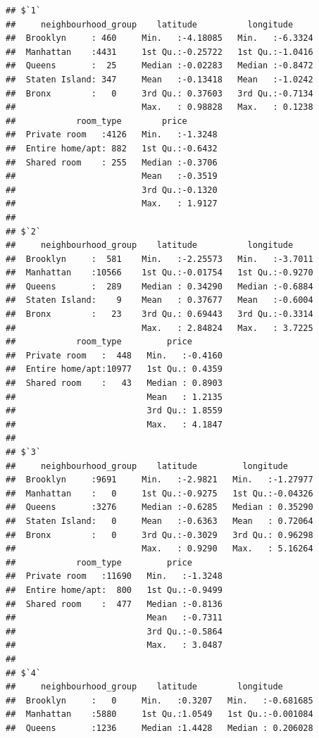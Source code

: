 \documentclass[
]{article}
\begin{document}
\begin{verbatim}
## $`1`
##     neighbourhood_group    latitude          longitude      
##  Brooklyn     : 460     Min.   :-4.18085   Min.   :-6.3324  
##  Manhattan    :4431     1st Qu.:-0.25722   1st Qu.:-1.0416  
##  Queens       :  25     Median :-0.02283   Median :-0.8472  
##  Staten Island: 347     Mean   :-0.13418   Mean   :-1.0242  
##  Bronx        :   0     3rd Qu.: 0.37603   3rd Qu.:-0.7134  
##                         Max.   : 0.98828   Max.   : 0.1238  
##            room_type        price        
##  Private room   :4126   Min.   :-1.3248  
##  Entire home/apt: 882   1st Qu.:-0.6432  
##  Shared room    : 255   Median :-0.3706  
##                         Mean   :-0.3519  
##                         3rd Qu.:-0.1320  
##                         Max.   : 1.9127  
## 
## $`2`
##     neighbourhood_group    latitude          longitude      
##  Brooklyn     :  581    Min.   :-2.25573   Min.   :-3.7011  
##  Manhattan    :10566    1st Qu.:-0.01754   1st Qu.:-0.9270  
##  Queens       :  289    Median : 0.34290   Median :-0.6884  
##  Staten Island:    9    Mean   : 0.37677   Mean   :-0.6004  
##  Bronx        :   23    3rd Qu.: 0.69443   3rd Qu.:-0.3314  
##                         Max.   : 2.84824   Max.   : 3.7225  
##            room_type         price        
##  Private room   :  448   Min.   :-0.4160  
##  Entire home/apt:10977   1st Qu.: 0.4359  
##  Shared room    :   43   Median : 0.8903  
##                          Mean   : 1.2135  
##                          3rd Qu.: 1.8559  
##                          Max.   : 4.1847  
## 
## $`3`
##     neighbourhood_group    latitude         longitude       
##  Brooklyn     :9691     Min.   :-2.9821   Min.   :-1.27977  
##  Manhattan    :   0     1st Qu.:-0.9275   1st Qu.:-0.04326  
##  Queens       :3276     Median :-0.6285   Median : 0.35290  
##  Staten Island:   0     Mean   :-0.6363   Mean   : 0.72064  
##  Bronx        :   0     3rd Qu.:-0.3029   3rd Qu.: 0.96298  
##                         Max.   : 0.9290   Max.   : 5.16264  
##            room_type         price        
##  Private room   :11690   Min.   :-1.3248  
##  Entire home/apt:  800   1st Qu.:-0.9499  
##  Shared room    :  477   Median :-0.8136  
##                          Mean   :-0.7311  
##                          3rd Qu.:-0.5864  
##                          Max.   : 3.0487  
## 
## $`4`
##     neighbourhood_group    latitude        longitude        
##  Brooklyn     :   0     Min.   :0.3207   Min.   :-0.681685  
##  Manhattan    :5880     1st Qu.:1.0549   1st Qu.:-0.001084  
##  Queens       :1236     Median :1.4428   Median : 0.206028  

\end{verbatim}
\end{document}
